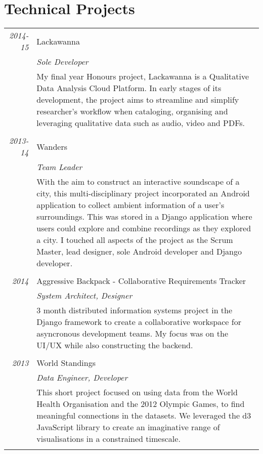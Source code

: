\documentclass[a4paper,10pt]{article}
\begin{document}
\section{Technical Projects}
\begin{longtable}{r|p{12cm}}
\emph {2014-15} & Lackawanna \\&\emph{Sole Developer}\\&\footnotesize{My final year Honours project, Lackawanna is a Qualitative Data Analysis Cloud Platform. In early stages of its development, the project aims to streamline and simplify researcher's workflow when cataloging, organising and leveraging qualitative data such as audio, video and PDFs.}\\\multicolumn{2}{c}{} \\
\emph {2013-14} & Wanders \\&\emph{Team Leader}\\&\footnotesize{With the aim to construct an interactive soundscape of a city, this multi-disciplinary project incorporated an Android application to collect ambient information of a user's surroundings. This was stored in a Django application where users could explore and combine recordings as they explored a city. I touched all aspects of the project as the Scrum Master, lead designer, sole Android developer and Django developer.}\\\multicolumn{2}{c}{} \\
\emph {2014} & Aggressive Backpack - Collaborative Requirements Tracker \\&\emph{System Architect, Designer}\\&\footnotesize{3 month distributed information systems project in the Django framework to create a collaborative workspace for asyncronous development teams. My focus was on the UI/UX while also constructing the backend.}\\\multicolumn{2}{c}{} \\
\emph {2013} & World Standings \\&\emph{Data Engineer, Developer}\\&\footnotesize{This short project focused on using data from the World Health Organisation and the 2012 Olympic Games, to find meaningful connections in the datasets. We leveraged the d3 JavaScript library to create an imaginative range of visualisations in a constrained timescale. }\\\multicolumn{2}{c}{} \\
\end{longtable}
\end{document}
